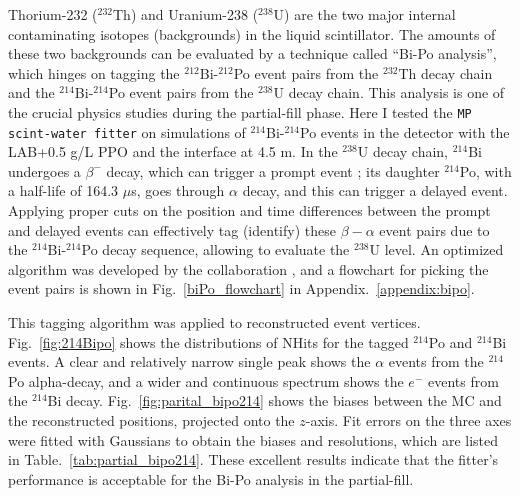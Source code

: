 Thorium-232 ($^{232}$Th) and Uranium-238 ($^{238}$U) are the two major internal contaminating isotopes (backgrounds) in the liquid scintillator. The amounts of these two backgrounds can be evaluated by a technique called ``Bi-Po analysis'', which hinges on tagging the $^{212}$Bi-$^{212}$Po event pairs from the $^{232}$Th decay chain and the $^{214}$Bi-$^{214}$Po event pairs from the $^{238}$U decay chain. This analysis is one of the crucial physics studies during the partial-fill phase. Here I tested the \texttt{MP scint-water fitter} on simulations of $^{214}$Bi-$^{214}$Po events in the detector with the LAB+0.5 g/L PPO and the interface at 4.5 m. In the $^{238}$U decay chain, $^{214}$Bi undergoes a $\beta^-$ decay, which can trigger a prompt event \cite{nndc}; its daughter $^{214}$Po, with a half-life of 164.3 $\mu$s, goes through $\alpha$ decay, and this can trigger a delayed event. Applying proper cuts on the position and time differences between the prompt and delayed events can effectively tag (identify) these $\beta-\alpha$ event pairs due to the $^{214}$Bi-$^{214}$Po decay sequence, allowing to evaluate the $^{238}$U level. An optimized algorithm was developed by the collaboration \cite{joshW1}, and a flowchart for picking the event pairs is shown in Fig.~\ref{biPo_flowchart} in Appendix.~\ref{appendix:bipo}.

This tagging algorithm was applied to reconstructed event vertices. Fig.~\ref{fig:214Bipo} shows the distributions of NHits for the tagged $^{214}$Po and $^{214}$Bi events. A clear and relatively narrow single peak shows the $\alpha$ events from the $^{214}$Po alpha-decay, and a wider and continuous spectrum shows the $e^-$ events from the $^{214}$Bi decay. Fig.~\ref{fig:parital_bipo214} shows the biases between the MC and the reconstructed positions, projected onto the $z$-axis. Fit errors on the three axes were fitted with Gaussians to obtain the biases and resolutions, which are listed in Table.~\ref{tab:partial_bipo214}. These excellent results indicate that the fitter's performance is acceptable for the Bi-Po analysis in the partial-fill.

